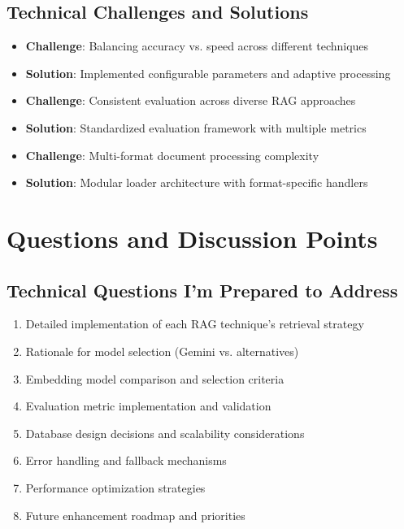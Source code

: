 \documentclass[12pt,a4paper]{article}
\begin{document}
\begin{itemize}
\subsection{Technical Challenges and Solutions}
\begin{itemize}
    \item \textbf{Challenge}: Balancing accuracy vs. speed across different techniques
    \item \textbf{Solution}: Implemented configurable parameters and adaptive processing
    \item \textbf{Challenge}: Consistent evaluation across diverse RAG approaches
    \item \textbf{Solution}: Standardized evaluation framework with multiple metrics
    \item \textbf{Challenge}: Multi-format document processing complexity
    \item \textbf{Solution}: Modular loader architecture with format-specific handlers
\end{itemize}

\section{Questions and Discussion Points}

\subsection{Technical Questions I'm Prepared to Address}
\begin{enumerate}
    \item Detailed implementation of each RAG technique's retrieval strategy
    \item Rationale for model selection (Gemini vs. alternatives)
    \item Embedding model comparison and selection criteria
    \item Evaluation metric implementation and validation
    \item Database design decisions and scalability considerations
    \item Error handling and fallback mechanisms
    \item Performance optimization strategies
    \item Future enhancement roadmap and priorities
\end{enumerate}


\end{itemize}
\end{document}
